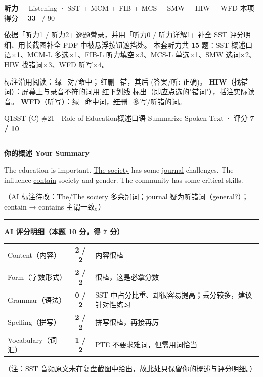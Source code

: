 \documentclass[11pt]{article}
\newcommand{\ptesub}[1]{%
  \par\needspace{2\baselineskip}\smallskip
  {\color{cAccent}\rule[-0.2ex]{3pt}{1.05em}}\hspace{6pt}%
  {\bfseries\color{cHead}#1}\par\nopagebreak\smallskip}
\newcommand{\ptesection}[3]{%
  \needspace{6\baselineskip}
  \begin{tcolorbox}[enhanced, colback=cAccent, colframe=cAccent, sharp corners,
     left=14pt, right=14pt, top=10pt, bottom=10pt, boxrule=0pt]
    {\fontsize{20}{24}\selectfont\bfseries\color{white} #1\ \ }%
    {\large\color{white!85} #2}\hfill
    {\large\color{white}本项得分\ \ }{\fontsize{22}{24}\selectfont\bfseries\color{white} #3}%
    \ {\color{white!85}/ 90}
  \end{tcolorbox}}
\begin{document}
\ptesection{听力}{Listening · SST + MCM + FIB + MCS + SMW + HIW + WFD}{33}

\vspace{1mm}
{\small\color{gray} 依据「听力1 / 听力2」逐题誊录，并用「听力0 / 听力详解1」补全 SST 评分明细、用长截图补全 PDF 中被悬浮按钮遮挡处。
本套听力共 \textbf{15} 题：SST 概述口语$\times$1、MCM-L 多选$\times$1、FIB-L 听力填空$\times$3、MCS-L 单选$\times$1、SMW 选词$\times$2、HIW 找错词$\times$3、WFD 听写$\times$4。}
\vspace{1mm}

\begin{notebox}
{\footnotesize 标注沿用阅读：{\color{cFix}\,绿=对/命中}；{\color{cWrong}\,红删=错}，其后 {\color{cFix}(答案/听: 正确)}。
\textbf{HIW}（找错词）：屏幕上与录音不符的词用 {\color{cWrong}\uline{红下划线}} 标出（即应点选的"错词"），括注实际读音。
\textbf{WFD}（听写）：{\color{cFix}绿}=命中词，{\color{cWrong}\sout{红删}}=多写/听错的词。}
\end{notebox}

\begin{qblock}{Q1\quad SST (C) \#21\ \ Role of Education}{概述口语 Summarize Spoken Text · 评分 \textcolor{cAccent}{\bfseries 7 / 10}}
\ptesub{你的概述 Your Summary}
\begin{promptbox}
The education is important. {\color{cAccent}\uline{The society}} has some {\color{cAccent}\uline{journal}} challenges. The influence {\color{cAccent}\uline{contain}} society and gender. The community has some critical skills.
\end{promptbox}
{\footnotesize\color{gray}（AI 标注待改：The/The society 多余冠词；journal 疑为听错词（general?）；contain → contains 主谓一致。）}
\ptesub{AI 评分明细（本题 10 分，得 \textcolor{cAccent}{\bfseries 7} 分）}
\begin{notebox}\small
\begin{tabular}{@{}lcl@{}}
Content（内容）& \textbf{2 / 2} & 内容很棒\\
Form（字数形式）& \textbf{2 / 2} & 很棒，这是必拿分数\\
Grammar（语法）& \textcolor{cWrong}{\bfseries 0 / 2} & SST 中占分比重、却很容易提高；丢分较多，建议针对性练习\\
Spelling（拼写）& \textbf{2 / 2} & 拼写很棒，再接再厉\\
Vocabulary（词汇）& \textbf{1 / 2} & PTE 不要求难词，但需用词恰当\\
\end{tabular}
\end{notebox}
{\footnotesize\color{gray}（注：SST 音频原文未在复盘截图中给出，故此处只保留你的概述与评分明细。）}
\end{qblock}
\end{document}
